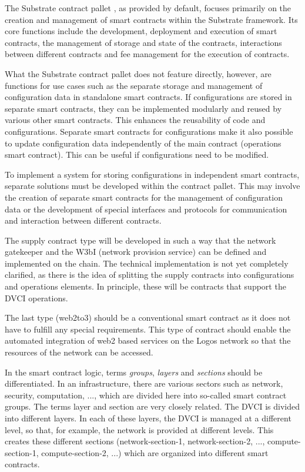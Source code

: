 \documentclass[]{article}
\begin{document}
The Substrate contract pallet \cite{sub-contract-pallet}, as provided by default, focuses primarily on the creation and management of smart contracts within the Substrate framework. 
Its core functions include the development, deployment and execution of smart contracts, the management of storage and state of the contracts, interactions between different contracts and fee management for the execution of contracts. 

What the Substrate contract pallet does not feature directly, however, are functions for use cases such as the separate storage and management of configuration data in standalone smart contracts.
If configurations are stored in separate smart contracts, they can be implemented modularly and reused by various other smart contracts. This enhances the reusability of code and configurations.
Separate smart contracts for configurations make it also possible to update configuration data independently of the main contract (operations smart contract). 
This can be useful if configurations need to be modified.

To implement a system for storing configurations in independent smart contracts, separate solutions must be developed within the contract pallet. 
This may involve the creation of separate smart contracts for the management of configuration data or the development of special interfaces and protocols for communication and interaction between different contracts.

The supply contract type will be developed in such a way that the network gatekeeper and the W3bI (network provision service) can be defined and implemented on the chain. 
The technical implementation is not yet completely clarified, as there is the idea of splitting the supply contracts into configurations and operations elements. 
In principle, these will be contracts that support the DVCI operations.

The last type (web2to3) should be a conventional smart contract as it does not have to fulfill any special requirements.
This type of contract should enable the automated integration of web2 based services on the Logos network so that the resources of the network can be accessed.

In the smart contract logic, terms \textit{groups}, \textit{layers} and \textit{sections} should be differentiated.
In an infrastructure, there are various sectors such as network, security, computation, ..., which are divided here into so-called smart contract groups.
The terms layer and section are very closely related. 
The DVCI is divided into different layers. 
In each of these layers, the DVCI is managed at a different level, so that, for example, the network is provided at different levels.
This creates these different sections (network-section-1, network-section-2, ..., compute-section-1, compute-section-2, ...) which are organized into different smart contracts.
\end{document}
